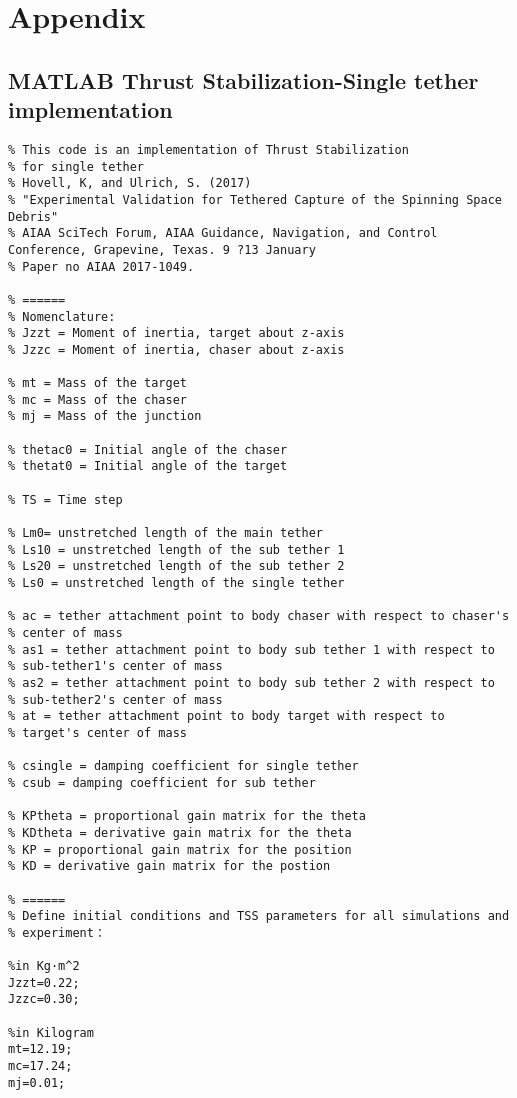 \chapter{Appendix}\label{section-appendix} 
\section{MATLAB Thrust Stabilization-Single tether implementation}\label{appendix-thruststab}
\begin{lstlisting}
% This code is an implementation of Thrust Stabilization
% for single tether
% Hovell, K, and Ulrich, S. (2017)
% "Experimental Validation for Tethered Capture of the Spinning Space Debris"
% AIAA SciTech Forum, AIAA Guidance, Navigation, and Control Conference, Grapevine, Texas. 9 ?13 January
% Paper no AIAA 2017-1049.

% ======
% Nomenclature:
% Jzzt = Moment of inertia, target about z-axis 
% Jzzc = Moment of inertia, chaser about z-axis

% mt = Mass of the target
% mc = Mass of the chaser
% mj = Mass of the junction

% thetac0 = Initial angle of the chaser 
% thetat0 = Initial angle of the target

% TS = Time step

% Lm0= unstretched length of the main tether
% Ls10 = unstretched length of the sub tether 1
% Ls20 = unstretched length of the sub tether 2
% Ls0 = unstretched length of the single tether

% ac = tether attachment point to body chaser with respect to chaser's
% center of mass
% as1 = tether attachment point to body sub tether 1 with respect to
% sub-tether1's center of mass
% as2 = tether attachment point to body sub tether 2 with respect to
% sub-tether2's center of mass
% at = tether attachment point to body target with respect to
% target's center of mass

% csingle = damping coefficient for single tether
% csub = damping coefficient for sub tether

% KPtheta = proportional gain matrix for the theta 
% KDtheta = derivative gain matrix for the theta
% KP = proportional gain matrix for the position
% KD = derivative gain matrix for the postion

% ======
% Define initial conditions and TSS parameters for all simulations and
% experiment：

%in Kg·m^2
Jzzt=0.22; 
Jzzc=0.30; 

%in Kilogram
mt=12.19; 
mc=17.24; 
mj=0.01;


\end{lstlisting}
